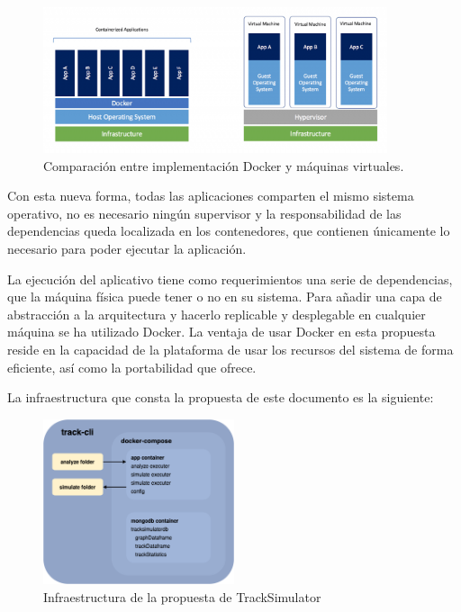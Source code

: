 \begin{figure}[!htb]
\begin{center}
\includegraphics[width=0.9\textwidth]{./Imagenes/DockerComparision.png}
\caption{Comparación entre implementación Docker y máquinas virtuales. \cite{Docker02}}
\label{DockerComparision}
\end{center}
\end{figure}


Con esta nueva forma, todas las aplicaciones comparten el mismo sistema operativo, no es necesario ningún supervisor 
y la responsabilidad de las dependencias queda localizada en los contenedores, que contienen únicamente lo necesario 
para poder ejecutar la aplicación.

La ejecución del aplicativo tiene como requerimientos una serie de dependencias, que la máquina física puede tener o no 
en su sistema. Para añadir una capa de abstracción a la arquitectura y hacerlo replicable y desplegable en cualquier máquina
se ha utilizado Docker. La ventaja de usar Docker en esta propuesta reside en la capacidad de la plataforma de usar los 
recursos del sistema de forma eficiente, así como la portabilidad que ofrece.

La infraestructura que consta la propuesta de este documento es la siguiente:
\begin{figure}[htb]
\begin{center}
\includegraphics[width=0.5\textwidth]{./Imagenes/DockerStructure.png}
\caption{Infraestructura de la propuesta de TrackSimulator}
\label{DockerComparision}
\end{center}
\end{figure}
\newpage

